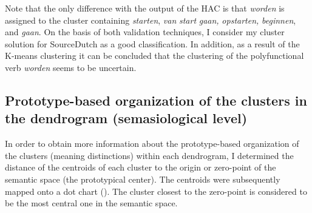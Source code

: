 Note that the only difference with the output of the HAC is that \textit{worden} is assigned to the cluster containing \textit{starten}, \textit{van} \textit{start} \textit{gaan,} \textit{opstarten,} \textit{beginnen}, and \textit{gaan}. On the basis of both validation techniques, I consider my cluster solution for SourceDutch as a good classification. In addition, as a result of the K-means clustering it can be concluded that the clustering of the polyfunctional verb \textit{worden} seems to be uncertain.

\subsection{Prototype-based organization of the clusters in the dendrogram (semasiological level)}
\label{sec:4.2.2}  
In order to obtain more information about the prototype-based organization of the clusters (meaning distinctions) within each dendrogram, I determined the distance of the centroids of each cluster to the origin or zero-point of the semantic space (the prototypical center). The centroids were subsequently mapped onto a dot chart (). The cluster closest to the zero-point is considered to be the most central one in the semantic space.

